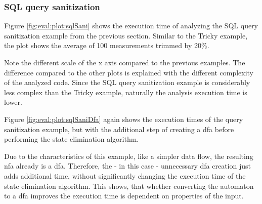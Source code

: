 \subsubsection{SQL query sanitization}

Figure \ref{fig:eval:plot:sqlSani} shows the execution time of analyzing the SQL query sanitization example from the previous section. Similar to the Tricky example, the plot shows the average of 100 measurements trimmed by 20\%. 

Note the different scale of the x axis compared to the previous examples. The difference compared to the other plots is explained with the different complexity of the analyzed code. Since the SQL query sanitization example is considerably less complex than the Tricky example, naturally the analysis execution time is lower. 

Figure \ref{fig:eval:plot:sqlSaniDfa} again shows the execution times of the query sanitization example, but with the additional step of creating a \ac{dfa} before performing the state elimination algorithm.

Due to the characteristics of this example, like a simpler data flow, the resulting \ac{nfa} already is a \ac{dfa}. Therefore, the - in this case - unnecessary \ac{dfa} creation just adds additional time, without significantly changing the execution time of the state elimination algorithm. This shows, that whether converting the automaton to a \ac{dfa} improves the execution time is dependent on properties of the input.

